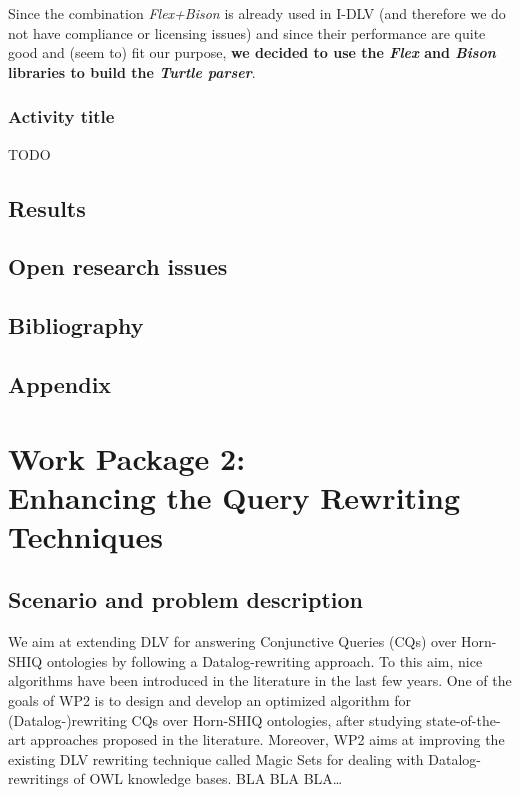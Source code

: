 \documentclass[oneside]{book}
\begin{document}
Since the combination \emph{Flex+Bison} is already used in I-DLV (and therefore we do not have compliance or licensing issues) and since their performance are quite good and (seem to) fit our purpose, \textbf{we decided to use the \emph{Flex} and \emph{Bison} libraries to build the \emph{Turtle parser}}.



\section{Activity title}
TODO
\chapter{Results}
\chapter{Open research issues}
\chapter{Bibliography}
\chapter{Appendix}



\setcounter{chapter}{0}

\part*{Work Package 2:\\Enhancing the Query Rewriting Techniques}

\chapter{Scenario and problem description}

We aim at extending DLV for answering Conjunctive Queries (CQs) over Horn-SHIQ ontologies by following a Datalog-rewriting approach. To this aim, nice algorithms have been introduced in the literature in the last few years. One of the goals of WP2 is to design and develop an optimized algorithm for (Datalog-)rewriting CQs over Horn-SHIQ ontologies, after studying state-of-the-art approaches proposed in the literature. Moreover, WP2 aims at improving the existing DLV rewriting technique called Magic Sets for dealing with Datalog-rewritings of OWL knowledge bases. 
BLA BLA BLA…
\end{document}
